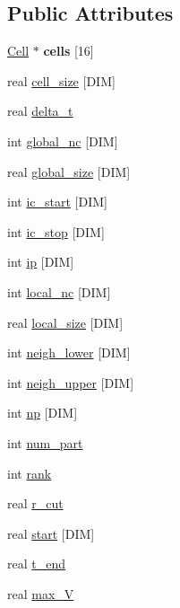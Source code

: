 \subsection*{Public Attributes}
\begin{DoxyCompactItemize}
\item 
\hypertarget{class_sim_process_a1c6d3ba10262d0278267db46903f187f}{\hyperlink{class_cell}{Cell} $\ast$ {\bfseries cells} \mbox{[}16\mbox{]}}\label{class_sim_process_a1c6d3ba10262d0278267db46903f187f}

\item 
real \hyperlink{class_sim_process_acb71c08a7b0fc7ca809540f793421327}{cell\-\_\-size} \mbox{[}D\-I\-M\mbox{]}
\item 
real \hyperlink{class_sim_process_a1862e53aaf344ae900c797d8101de8c6}{delta\-\_\-t}
\item 
int \hyperlink{class_sim_process_a43ebeee5f1b854c9ee048a72d0d0a623}{global\-\_\-nc} \mbox{[}D\-I\-M\mbox{]}
\item 
real \hyperlink{class_sim_process_a3a30f5356527bf30f9cbf3f7b21f0316}{global\-\_\-size} \mbox{[}D\-I\-M\mbox{]}
\item 
int \hyperlink{class_sim_process_a629f7301a4a5fc34d75240fd53ba5266}{ic\-\_\-start} \mbox{[}D\-I\-M\mbox{]}
\item 
int \hyperlink{class_sim_process_a4cdde257ea292d400576dbd8e36f8cde}{ic\-\_\-stop} \mbox{[}D\-I\-M\mbox{]}
\item 
int \hyperlink{class_sim_process_a258e3fa7cfc226d61d940de1599dfa2a}{ip} \mbox{[}D\-I\-M\mbox{]}
\item 
int \hyperlink{class_sim_process_a289a9950d641f552152ed2c124978839}{local\-\_\-nc} \mbox{[}D\-I\-M\mbox{]}
\item 
real \hyperlink{class_sim_process_a4694d23dff9f83ae985f8dfbfa2939cb}{local\-\_\-size} \mbox{[}D\-I\-M\mbox{]}
\item 
int \hyperlink{class_sim_process_a6ae71932cae5aff19988c1192ec4f67b}{neigh\-\_\-lower} \mbox{[}D\-I\-M\mbox{]}
\item 
int \hyperlink{class_sim_process_ada0a3a713c8996789bb3a492d9270957}{neigh\-\_\-upper} \mbox{[}D\-I\-M\mbox{]}
\item 
int \hyperlink{class_sim_process_aa8d2ec90bd4b578d85a7668bb890b6e5}{np} \mbox{[}D\-I\-M\mbox{]}
\item 
int \hyperlink{class_sim_process_abaafb96c0e7dfea4a845266511edebaa}{num\-\_\-part}
\item 
int \hyperlink{class_sim_process_a61c8c83a418419c93c7b78ddc7619fe3}{rank}
\item 
real \hyperlink{class_sim_process_a20db5f22c2255a68a332b950897cbdb0}{r\-\_\-cut}
\item 
real \hyperlink{class_sim_process_a0ccee10b1ffc00cc7846c4530f8e0357}{start} \mbox{[}D\-I\-M\mbox{]}
\item 
real \hyperlink{class_sim_process_aa9b2269bf9f85fa0f8bc7aa7932ef046}{t\-\_\-end}
\item 
real \hyperlink{class_sim_process_a7f1db440fa09d4e6826a552602724e76}{max\-\_\-\-V}
\end{DoxyCompactItemize}


